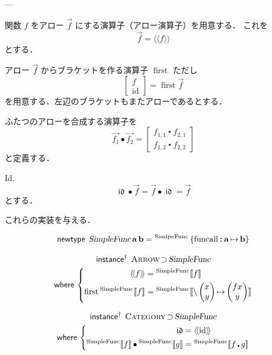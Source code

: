 \documentclass[a5paper,twoside,fleqn,draft]{jsbook}
\def\[{[\![}
\def\]{]\!]}
\newcommand{\Langle}{\langle\!\langle}
\newcommand{\Rangle}{\rangle\!\rangle}
\newcommand{\mKeyword}[1]{\mathsf{#1}}
\newcommand{\mInstanceDeclKeyword}{\mKeyword{instance}}
\newcommand{\mNewTypeDeclKeyword}{\mKeyword{newtype}}
\newcommand{\mWhereKeyword}{\mKeyword{where}}
\DeclareMathOperator{\mInstanceDeclPolymorphic}{\mInstanceDeclKeyword^{\dagger}}
\DeclareMathOperator{\mNewTypeDecl}{\mNewTypeDeclKeyword}
\DeclareMathOperator{\mSuperSet}{\supset}
\DeclareMathOperator{\mWhere}{\mWhereKeyword}
\newcommand{\mSpecialFunc}[1]{#1}
\newcommand{\mVarSpecialFunc}[1]{\mathfrak{#1}}
\DeclareMathOperator{\mFirst}{\mSpecialFunc{first}}
\DeclareMathOperator{\mFuncall}{\mSpecialFunc{funcall}}
\DeclareMathOperator{\mId}{\mSpecialFunc{id}}
\DeclareMathOperator{\mIdCat}{\mVarSpecialFunc{id}}
\DeclareMathOperator{\mComp}{\centerdot}
\DeclareMathOperator{\mCompCat}{\bullet}
\DeclareMathOperator{\mFuncArrow}{\mapsto}
\DeclareMathOperator{\mIn}{{:\!:}}
\DeclareMathOperator{\mLambda}{\backslash}
\DeclareMathOperator{\mLambdaArrow}{\mapsto}
\newcommand{\mType}[1]{\mathbf{#1}} %
\newcommand{\mA}{\mType{a}}
\newcommand{\mB}{\mType{b}}
\newcommand{\mTypeConstructor}[1]{\textsl{#1}}
\newcommand{\mValueConstructor}[1]{\mathrm{#1}}
\newcommand{\mValueWith}[2]{{}^\mValueConstructor{#1}\[#2\]}
\newcommand{\mValueRecordBeginWith}[1]{{}^\mValueConstructor{#1}\,\{}
\newcommand{\mValueRecordEnd}{\}}
\newcommand{\mValueRecordWith}[2]{\mValueRecordBeginWith{#1}{#2}\mValueRecordEnd}
\newcommand{\mArrowWith}[1]{\Langle#1\Rangle}
\newcommand{\mPairWith}[2]{\begin{pmatrix}#1\\#2\end{pmatrix}}
\newcommand{\mTypeClass}[1]{\textsc{#1}} %
\newcommand{\mArrowTypeClass}{\mTypeClass{Arrow}}
\newcommand{\mCategoryTypeClass}{\mTypeClass{Category}}
\newcommand{\mArrow}[1]{\Vec{#1}}
\begin{document}
---

関数 $f$ をアロー $\mArrow{f}$ にする演算子（アロー演算子）を用意する．
これを
\begin{equation}
  \mArrow{f}=\mArrowWith{f}
\end{equation}
とする．

アロー $\mArrow{f}$ からブラケットを作る演算子 $\mFirst$ ただし
\begin{equation}
  \begin{bmatrix}
    f\\
    \mId
  \end{bmatrix}
  =
  \mFirst\mArrow{f}
\end{equation}
を用意する．左辺のブラケットもまたアローであるとする．

ふたつのアローを合成する演算子を
\begin{equation}
  \mArrow{f_1}\mCompCat\mArrow{f_2}
  =
  \begin{bmatrix}
    f_{1,1}\mComp f_{2,1}\\
    f_{1,2}\mComp f_{2,2}
  \end{bmatrix}
\end{equation}
と定義する．

Id.
\begin{equation}
  \mIdCat\mCompCat\mArrow{f}
  =\mArrow{f}\mCompCat\mIdCat
  =\mArrow{f}
\end{equation}
とする．

これらの実装を与える．

\begin{equation}
  \mNewTypeDecl\;
  \mTypeConstructor{SimpleFunc}\,\mA\,\mB
  =\mValueRecordWith{SimlpeFunc}{\mFuncall\mIn\mA\mFuncArrow\mB}
\end{equation}

\begin{multline}
  \mInstanceDeclPolymorphic\;
  \mArrowTypeClass\mSuperSet\mTypeConstructor{SimpleFunc}\\
  \mWhere{}
  \left\{
  \begin{aligned}
    \mArrowWith{f}
    &=\mValueWith{SimpleFunc}{f}\\
    \mFirst\mValueWith{SimpleFunc}{f}
    &=\mValueWith{SimpleFunc}{\mLambda\mPairWith{x}{y}\mLambdaArrow\mPairWith{fx}{y}}
  \end{aligned}
  \right.
\end{multline}

\begin{multline}
  \mInstanceDeclPolymorphic\;
  \mCategoryTypeClass\mSuperSet\mTypeConstructor{SimpleFunc}\\
  \mWhere{}
  \left\{
  \begin{aligned}
    \mIdCat
    &=\mArrowWith{\mId}\\
    \mValueWith{SimpleFunc}{f}\mCompCat\mValueWith{SimpleFunc}{g}
    &=\mValueWith{SimpleFunc}{f\mComp g}
  \end{aligned}
  \right.
\end{multline}
\end{document}
